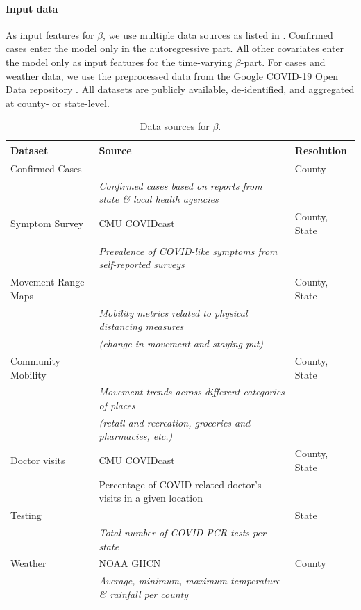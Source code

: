 \documentclass{article}
\newcommand{\bAR}{\ensuremath{\beta}\text{-AR}\xspace}
\begin{document}
\paragraph{Input data} As input features for \bAR, we use multiple data sources
as listed in . Confirmed cases enter the model only in the
autoregressive part. All other covariates enter the model only as input features
for the time-varying \(\beta\)-part. For cases and weather data, we use the
preprocessed data from the Google COVID-19 Open Data repository
\citep{data/Wahltinez2020}. All datasets are publicly available, de-identified,
and aggregated at county- or state-level.

\begin{table}[t]
\small
\caption{Data sources for \bAR.\label{tab:data-sources}}
\centering
\begin{tabular}{lll}
\toprule
\bf Dataset & \bf Source & \bf Resolution \\
\midrule
Confirmed Cases &  \citet{data/nytimes_cases} &  County \\
& \multicolumn{1}{l}{\it Confirmed cases based on reports from state \& local health agencies} \\
\midrule
Symptom Survey & CMU COVIDcast \citep{data/covidcast} & County, State \\
& \citet{data/fb_symptom_survey} \\
& \multicolumn{1}{l}{\it Prevalence of COVID-like symptoms from self-reported surveys} \\
\midrule
Movement Range Maps &  \citet{data/fb_movement_range} &  County, State \\
& \multicolumn{1}{l}{\it Mobility metrics related to physical distancing measures} \\
& \multicolumn{1}{l}{\it (change in movement and staying put)} \\
\midrule
Community Mobility & \citet{data/google_mobility} &  County, State \\
& \multicolumn{1}{l}{\it Movement trends across different categories of places} \\
& \multicolumn{1}{l}{\it (retail and recreation, groceries and pharmacies, etc.)} \\
\midrule
Doctor visits & CMU COVIDcast \citep{data/covidcast} & County, State \\
& \multicolumn{1}{l}{Percentage of COVID-related doctor’s visits in a given location} \\
\midrule
Testing &  \citet{data/covidtracking} & State \\
& \multicolumn{1}{l}{\it Total number of COVID PCR tests per state} \\
\midrule
Weather & NOAA GHCN \citep{data/menne2012overview} &  County \\
& \multicolumn{1}{l}{\it Average, minimum, maximum temperature \& rainfall per county} \\
\bottomrule
\end{tabular}
\end{table}
\end{document}

